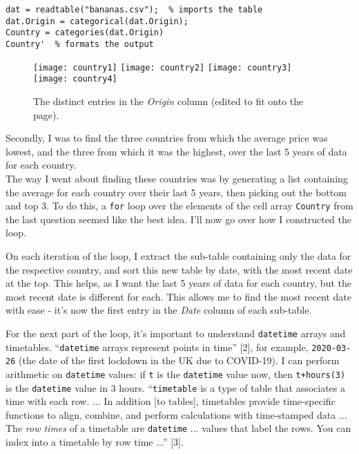 \documentclass[a4paper,12pt]{article}
\begin{document}
\begin{lstlisting}
dat = readtable("bananas.csv");  % imports the table
dat.Origin = categorical(dat.Origin);
Country = categories(dat.Origin)
Country'  % formats the output
\end{lstlisting}
\newpage
\begin{figure}[h]
\centering
\texttt{[image: country1]}
\texttt{[image: country2]}
\texttt{[image: country3]}
\texttt{[image: country4]}
\caption{The distinct entries in the \textit{Origin} column (edited to fit onto the page).}
\end{figure}

Secondly, I was to find the three countries from which the average price was lowest, and the three from which it was the highest, over the last 5 years of data for each country. \\

The way I went about finding these countries was by generating a list containing the average for each country over their last 5 years, then picking out the bottom and top 3. To do this, a \verb!for! loop over the elements of the cell array \verb!Country! from the last question seemed like the best idea. I'll now go over how I constructed the loop.

On each iteration of the loop, I extract the sub-table containing only the data for the respective country, and sort this new table by date, with the most recent date at the top. This helps, as I want the last 5 years of data for each country, but the most recent date is different for each. This allows me to find the most recent date with ease - it's now the first entry in the \textit{Date} column of each sub-table.

For the next part of the loop, it's important to understand \verb!datetime! arrays and timetables. ``\verb!datetime! arrays represent points in time'' [2], for example, \verb!2020-03-26! (the date of the first lockdown in the UK due to COVID-19). I can perform arithmetic on \verb!datetime! values: if \verb!t! is the \verb!datetime! value now, then \verb!t+hours(3)! is the \verb!datetime! value in 3 hours. ``\verb!timetable! is a type of table that associates a time with each row. ... In addition [to tables], timetables provide time-specific functions to align, combine, and perform calculations with time-stamped data ... The \textit{row times} of a timetable are \verb!datetime! ... values that label the rows. You can index into a timetable by row time ...'' [3].
\end{document}
